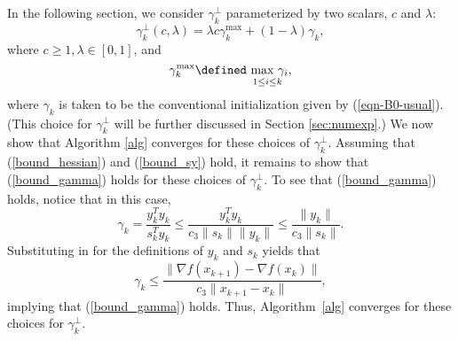 \bigskip

In the following section, we consider 
$\gamma_k^{\perp}$ parameterized by two scalars, $c$ and $\lambda$:
\begin{equation}\label{eqn-gammaperp1}
\gamma_k^{\perp}(c,\lambda) = \lambda c \gamma_k^{\max} + (1 - \lambda)\gamma_k,
\end{equation}
where $c \ge 1, \lambda \in [0,1]$, and
$$
 \gamma_k^{\text{max}}\defined \underset{1 \le i \le k}{ \text{ max } \gamma_i },
 $$
where  $\gamma_k$ is taken to be
the conventional initialization given by (\ref{eqn-B0-usual}).  
(This choice for $\gamma_k^\perp$ will be further discussed
in Section \ref{sec:numexp}.)  We now show that Algorithm \ref{alg}
converges for these choices of $\gamma_k^\perp$.  Assuming that
(\ref{bound_hessian}) and (\ref{bound_sy}) hold, it remains to show that
(\ref{bound_gamma}) holds for these choices of $\gamma_k^\perp$.  To see
that (\ref{bound_gamma}) holds, notice that in this case, $$\gamma_k
= \frac{y_k^Ty_k}{s_k^Ty_k}\le \frac{y_k^Ty_k}{c_3\|s_k\|\|y_k\|}
\le \frac{\|y_k\|}{c_3\|s_k\|}.$$  Substituting in for the definitions of $y_k$ and $s_k$ yields that
$$
\gamma_k \le \frac{\|\nabla f(x_{k+1})-\nabla f(x_k)\|}{c_3\|x_{k+1}-x_k\|},$$
implying that (\ref{bound_gamma}) holds.  Thus, Algorithm~\ref{alg} converges
for these choices for $\gamma_k^\perp$.

